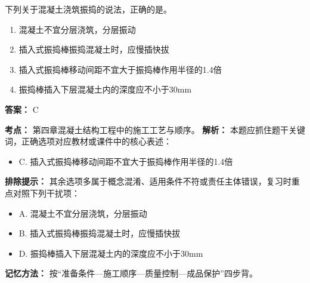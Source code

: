 \documentclass[UTF8,fontset=fandol,11pt]{ctexart}
\begin{document}
\begin{quizbox}[title={第 74 题}]
下列关于混凝土浇筑振捣的说法，正确的是。\\
\begin{enumerate}[label=\Alph*.]
\item 混凝土不宜分层浇筑，分层振动
\item 插入式振捣棒振捣混凝土时，应慢插快拔
\item 插入式振捣棒移动间距不宜大于振捣棒作用半径的1.4倍
\item 振捣棒插入下层混凝土内的深度应不小于30mm
\end{enumerate}
\textbf{答案：} C
\vspace{0.25em}
\begin{answerbox}[title={考点解析}]
\textbf{考点：} 第四章混凝土结构工程中的施工工艺与顺序。
\textbf{解析：} 本题应抓住题干关键词，正确选项对应教材或课件中的核心表述：
\begin{itemize}
\item C. 插入式振捣棒移动间距不宜大于振捣棒作用半径的1.4倍
\end{itemize}
\textbf{排除提示：} 其余选项多属于概念混淆、适用条件不符或责任主体错误，复习时重点对照下列干扰项：
\begin{itemize}
\item A. 混凝土不宜分层浇筑，分层振动
\item B. 插入式振捣棒振捣混凝土时，应慢插快拔
\item D. 振捣棒插入下层混凝土内的深度应不小于30mm
\end{itemize}
\textbf{记忆方法：} 按“准备条件—施工顺序—质量控制—成品保护”四步背。
\end{answerbox}
\end{quizbox}
\end{document}
